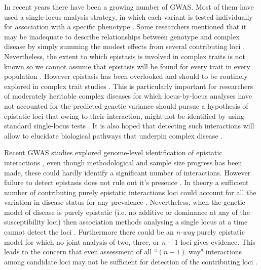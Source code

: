 In recent years there have been a growing number of GWAS.
Most of them have used a single-locus analysis strategy, in which each variant is tested individually for association with a specific phenotype \cite{cordell2009detecting}.
Some researchers mentioned that it may be inadequate to describe relationships between genotype and complex disease by simply summing the modest effects from several contributing loci \cite{culverhouse2002perspective}.
Nevertheless, the extent to which epistasis is involved in complex traits is not known so we cannot assume that epistasis will be found for every trait in every population \cite{carlborg2004epistasis}.
However epistasis has been overlooked and should to be routinely explored in complex trait studies \cite{carlborg2004epistasis}.
This is particularly important for researchers of moderately heritable complex diseases for which locus-by-locus analyses have not accounted for the predicted genetic variance should pursue a hypothesis of epistatic loci \cite{culverhouse2002perspective} that owing to their interaction, might not be identified by using standard single-locus tests \cite{cordell2009detecting}.
It is also hoped that detecting such interactions will allow to elucidate biological pathways that underpin complex disease \cite{cordell2009detecting}.

Recent GWAS studies explored genome-level identification of epistatic interactions \cite{ackermann2012systematic}, even though methodological and sample size progress has been made, these could hardly identify a significant number of interactions. 
However failure to detect epistasis does not rule out it's presence \cite{zuk2012mystery}.
In theory a sufficient number of contributing purely epistatic interactions loci could account for all the variation in disease status for any prevalence \cite{culverhouse2002perspective}.
Nevertheless, when the genetic model of disease is purely epistatic (i.e. no additive or dominance at any of the susceptibility loci) then association methods analysing a single locus at a time cannot detect the loci \cite{culverhouse2002perspective}.
Furthermore there could be an \textit{n-way} purely epistatic model for which no joint analysis of two, three, or $n-1$ loci gives evidence.
This leads to the concern that even assessment of all ``$(n-1)$ way" interactions among candidate loci may not be sufficient for detection of the contributing loci \cite{culverhouse2002perspective}.

